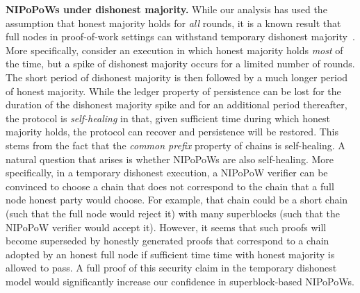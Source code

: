 \textbf{NIPoPoWs under dishonest majority.} While our analysis has used the
assumption that honest majority holds for \emph{all} rounds, it is a known
result that full nodes in proof-of-work settings can withstand
temporary dishonest majority~\cite{dishonest}. More specifically, consider an
execution in which honest majority holds \emph{most} of the time, but a spike of
dishonest majority occurs for a limited number of rounds. The short period of
dishonest majority is then followed by a much longer period of honest majority.
While the ledger property of persistence can be lost for the duration of the
dishonest majority spike and for an additional period thereafter, the protocol
is \emph{self-healing} in that, given sufficient time during which honest
majority holds, the protocol can recover and persistence will be restored. This
stems from the fact that the \emph{common prefix} property of chains is
self-healing. A natural question that arises is whether NIPoPoWs are also
self-healing. More specifically, in a temporary dishonest execution, a NIPoPoW
verifier can be convinced to choose a chain that does not correspond to the
chain that a full node honest party would choose. For example, that chain could
be a short chain (such that the full node would reject it) with many superblocks
(such that the NIPoPoW verifier would accept it). However, it seems that such
proofs will become superseded by honestly generated proofs that correspond to
a chain adopted by an honest full node if sufficient time time with honest
majority is allowed to pass. A full proof of this security claim in the
temporary dishonest model would significantly increase our confidence in
superblock-based NIPoPoWs.

